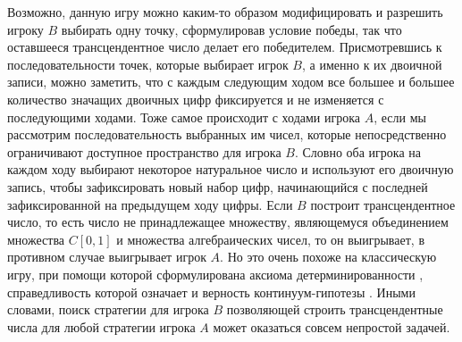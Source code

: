\documentclass[12pt]{article}
\begin{document}
Возможно, данную игру можно каким-то образом модифицировать и разрешить игроку $B$ выбирать одну точку, сформулировав условие победы, так что оставшееся трансцендентное число делает его победителем. Присмотревшись к последовательности точек, которые выбирает игрок $B$, а именно к их двоичной записи, можно заметить, что с каждым следующим ходом все большее и большее количество значащих двоичных цифр фиксируется и не изменяется с последующими ходами. Тоже самое происходит с ходами игрока $A$, если мы рассмотрим последовательность выбранных им чисел, которые непосредственно ограничивают доступное пространство для игрока $B$. Словно оба игрока на каждом ходу выбирают некоторое натуральное число и используют его двоичную запись, чтобы зафиксировать новый набор цифр, начинающийся с последней зафиксированной на предыдущем ходу цифры. Если $B$ построит трансцендентное число, то есть число не принадлежащее множеству, являющемуся объединением множества $C[0, 1]$ и множества алгебраических чисел, то он выигрывает, в противном случае выигрывает игрок $A$. Но это очень похоже на классическую игру, при помощи которой сформулирована аксиома детерминированности \cite{determinacy}, справедливость которой означает и верность континуум-гипотезы \cite{cantor-countinuum-hypothesis}. Иными словами, поиск стратегии для игрока $B$ позволяющей строить трансцендентные числа для любой стратегии игрока $A$ может оказаться совсем непростой задачей. 
\end{document}
